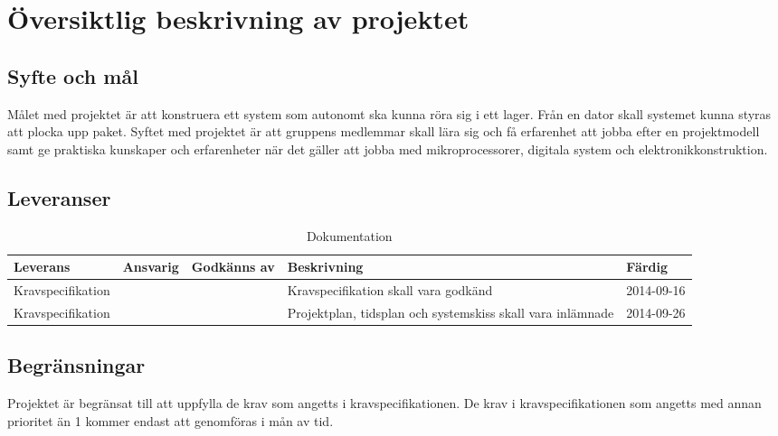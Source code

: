 \section{Översiktlig beskrivning av projektet}


\subsection{Syfte och mål}
Målet med projektet är att konstruera ett system som autonomt ska kunna röra sig i ett lager. Från en dator skall systemet kunna styras att plocka upp paket. Syftet med projektet är att gruppens medlemmar skall lära sig och få erfarenhet att jobba efter en projektmodell samt ge praktiska kunskaper och erfarenheter när det gäller att jobba med mikroprocessorer, digitala system och elektronikkonstruktion.

\subsection{Leveranser}

\begin{table}[h]
  \centering
    \begin{tabularx}{\textwidth}{| l | l | X | l | l |}
      \hline
      \textbf{Leverans} & \textbf{Ansvarig} & \textbf{Godkänns av} & \textbf{Beskrivning} & \textbf{Färdig} \\
      \hline
      {Kravspecifikation} & {} & {} & {Kravspecifikation skall vara godkänd} & {2014-09-16} \\
      \hline

      {Kravspecifikation} & {} & {} & {Projektplan, tidsplan och systemskiss skall vara inlämnade} & {2014-09-26} \\
      \hline
    \end{tabularx}
  \caption{Dokumentation} \label{dokumentation:tabell}
\end{table}


\subsection{Begränsningar}

Projektet är begränsat till att uppfylla de krav som angetts i kravspecifikationen. De krav i kravspecifikationen som angetts med annan prioritet än 1 kommer endast att genomföras i mån av tid. 
